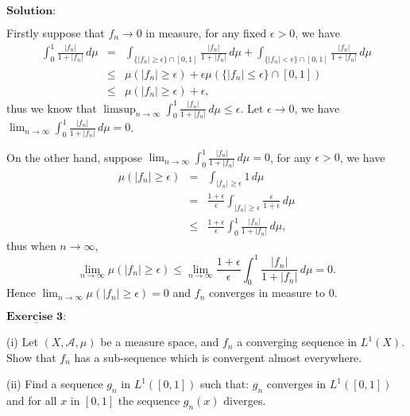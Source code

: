 \documentclass[12pt,a4paper]{ctexart}
\begin{document}
\vspace{8pt}
$\textbf{Solution:}$

Firstly suppose that $f_{n} \to 0$ in measure, for any fixed $\epsilon > 0$, we have
\begin{eqnarray*}
    \int_{0}^{1} \frac{|f_{n}|}{1 + |f_{n}|} \, d \mu & = & \int_{\{|f_{n}| \geq \epsilon\} \cap [0, 1]}^{} \frac{|f_{n}|}{1 + |f_{n}|} \, d \mu + \int_{\{|f_{n}| < \epsilon\} \cap [0, 1]}^{} \frac{|f_{n}|}{1 + |f_{n}|} \, d \mu \\
    & \leq & \mu({|f_{n}| \geq \epsilon}) + \epsilon \mu(\{|f_{n}| \leq \epsilon\} \cap [0, 1]) \\
    & \leq & \mu({|f_{n}| \geq \epsilon}) + \epsilon,
\end{eqnarray*}
thus we know that $\limsup_{n \to \infty} \int_{0}^{1} \frac{|f_{n}|}{1 + |f_{n}|} \, d \mu \leq \epsilon $. Let $\epsilon \to 0$, we have $\lim_{n \to \infty} \int_{0}^{1} \frac{|f_{n}|}{1 + |f_{n}|} \, d \mu = 0$.

On the other hand, suppose $\lim_{n \to \infty} \int_{0}^{1} \frac{|f_{n}|}{1 + |f_{n}|} \, d \mu = 0$, for any $\epsilon > 0$, we have
\begin{eqnarray*}
     \mu(|f_{n}| \geq \epsilon) & = & \int_{|f_{n}| \geq \epsilon}^{} 1 \, d \mu  \\
     & = & \frac{1 + \epsilon}{\epsilon} \int_{|f_{n}| \geq \epsilon}^{} \frac{\epsilon}{1 + \epsilon} \, d \mu \\
    & \leq & \frac{1 + \epsilon}{\epsilon} \int_{0}^{1} \frac{|f_{n}|}{1 + |f_{n}|} \, d \mu,
\end{eqnarray*}
thus when $n \to \infty$,
\begin{equation*}
    \lim_{n \to \infty} \mu(|f_{n}| \geq \epsilon) \leq  \lim_{n \to \infty} \frac{1 + \epsilon}{\epsilon} \int_{0}^{1} \frac{|f_{n}|}{1 + |f_{n}|} \, d \mu = 0.
\end{equation*}
Hence $\lim_{n \to \infty} \mu(|f_{n}| \geq \epsilon) = 0$ and $f_{n}$ converges in measure to $0$.


\newpage

$\underline{\textbf{Exercise 3:}}$

(i) Let $(X, \mathcal{A}, \mu)$ be a measure space, and $f_{n}$ a converging sequence in $L^{1}(X)$. Show that $f_{n}$ has a sub-sequence which is convergent almost everywhere.
\vspace{8pt}

(ii) Find a sequence $g_{n}$ in $L^{1}([0, 1])$ such that: $g_{n}$ converges in $L^{1}([0, 1])$ and for all $x$ in $[0, 1]$ the sequence $g_{n}(x)$ diverges.
\vspace{8pt}
\end{document}
